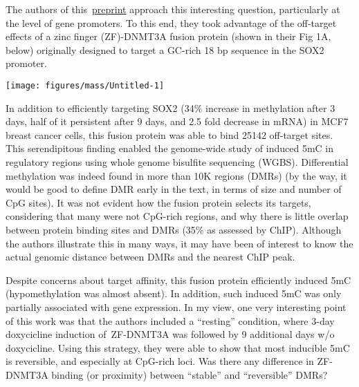\documentclass[10pt]{article}
\begin{document}
\par\null

The authors of this~\href{https://doi.org/10.1101/170506}{preprint}
approach this interesting question, particularly at the level of gene
promoters. To this end, they took advantage of the off-target effects of
a zinc finger (ZF)-DNMT3A fusion protein (shown in their Fig 1A, below)
originally designed to target a GC-rich 18 bp sequence in the SOX2
promoter.
\begin{figure*}[h!]
\begin{center}
\texttt{[image: figures/mass/Untitled-1]}

\end{center}
\end{figure*}

In addition to efficiently targeting SOX2 (34\% increase in methylation
after 3 days, half of it persistent after 9 days, and 2.5 fold decrease
in mRNA) in MCF7 breast cancer cells, this fusion protein was able to
bind 25142 off-target sites. This serendipitous finding enabled the
genome-wide study of induced 5mC in regulatory regions using whole
genome bisulfite sequencing (WGBS). Differential methylation was indeed
found in more than 10K regions (DMRs) (by the way, it would be good to
define DMR early in the text, in terms of size and number of CpG sites).
It was not evident how the fusion protein selects its targets,
considering that many were not CpG-rich regions, and why there is little
overlap between protein binding sites and DMRs (35\% as assessed by
ChIP). Although the authors illustrate this in many ways, it may have
been of interest to know the actual genomic distance between DMRs and
the nearest ChIP peak.

\par\null

Despite concerns about target affinity, this fusion protein efficiently
induced 5mC (hypomethylation was almost absent). In addition, such
induced 5mC was only partially associated with gene expression. In my
view, one very interesting point of this work was that the authors
included a ``resting'' condition, where 3-day doxycicline induction
of~ZF-DNMT3A was followed by 9 additional days w/o doxycicline. Using
this strategy, they were able to show that most inducible 5mC is
reversible, and especially at CpG-rich loci. Was there any difference in
ZF-DNMT3A binding (or proximity) between ``stable'' and ``reversible''
DMRs?

\par\null
\end{document}
